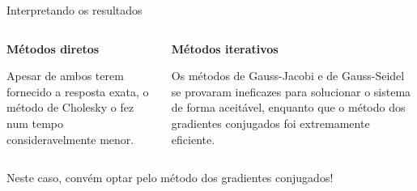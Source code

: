 \documentclass{beamer} %
\theoremstyle{definition}
\begin{document}
    \begin{frame}{Interpretando os resultados}
        \pause
        \begin{columns}
            \begin{column}{0.5\textwidth}
                \textbf{Métodos diretos} 
                \pause

                    Apesar de ambos terem fornecido a resposta exata, o método de Cholesky o fez num tempo consideravelmente menor.
            \end{column}
            \begin{column}{0.5\textwidth}
                \pause
                \textbf{Métodos iterativos}
                \pause

                Os métodos de Gauss-Jacobi e de Gauss-Seidel se provaram ineficazes para solucionar o sistema de forma aceitável, enquanto que o método dos gradientes conjugados foi extremamente eficiente.
            \end{column}
        \end{columns}
        \pause
        \vspace{10mm}
        Neste caso, convém optar pelo método dos gradientes conjugados!
    \end{frame}
\end{document}
